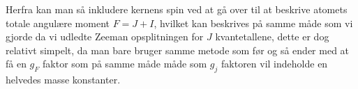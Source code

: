 \documentclass[../../Atom-ogMolekylefysik.tex]{subfiles}
\begin{document}
Herfra kan man så inkludere kernens spin ved at gå over til at beskrive atomets totale angulære moment $F=J+I$, hvilket kan beskrives på samme måde som vi gjorde da vi udledte Zeeman opsplitningen for $J$ kvantetallene, dette er dog relativt simpelt, da man bare bruger samme metode som før og så ender med at få en $g_F$ faktor som på samme måde måde som $g_j$ faktoren vil indeholde en helvedes masse konstanter.
\end{document}
